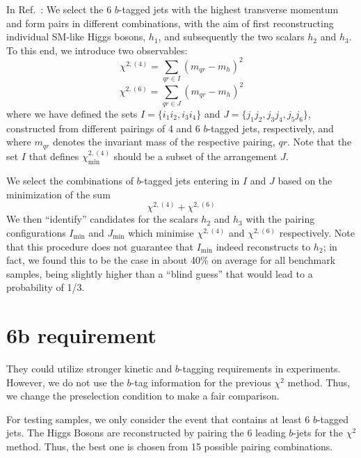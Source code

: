 \documentclass[12pt]{article}
\begin{document}
	In Ref.~\cite{Papaefstathiou:2020lyp}: We select the 6 $b$-tagged jets with the highest transverse momentum and form pairs in different combinations, with the aim of first reconstructing individual SM-like Higgs bosons, $h_1$, and subsequently the two scalars $h_2$ and $h_3$. To this end, we introduce two observables:
	\begin{equation}
		\chi^{2,(4)} = \sum_{qr\in I} (m_{qr} - m_h)^2
	\end{equation}
	\begin{equation}
		\chi^{2,(6)} = \sum_{qr\in J} (m_{qr} - m_h)^2
	\end{equation}
	where we have defined the sets $I = \{i_1i_2,i_3i_4\}$ and $J = \{j_1j_2,j_3j_4,j_5j_6\}$, constructed from different pairings of 4 and 6 $b$-tagged jets, respectively, and where $m_{qr}$ denotes the invariant mass of the respective pairing, $qr$. Note that the set $I$ that defines $\chi_{\text{min}}^{2,(4)}$ should be a subset of the arrangement $J$.

	We select the combinations of $b$-tagged jets entering in $I$ and $J$ based on the minimization of the sum
	\begin{equation}
		\chi^{2,(4)} + \chi^{2,(6)}
	\end{equation}
	We then ``identify'' candidates for the scalars $h_2$ and $h_3$ with the pairing configurations $I_{\text{min}}$ and $J_{\text{min}}$ which minimise $\chi^{2,(4)}$ and $\chi^{2,(6)}$ respectively. Note that this procedure does not guarantee that $I_{\text{min}}$ indeed reconstructs to $h_2$; in fact, we found this to be the case in about 40\% on average for all benchmark samples, being slightly higher than a ``blind guess'' that would lead to a probability of 1/3.

\section{6b requirement}%
\label{sec:6b_requirement}
	They could utilize stronger kinetic and $b$-tagging requirements in experiments. However, we do not use the $b$-tag information for the previous $\chi^2$ method. Thus, we change the preselection condition to make a fair comparison.

	For testing samples, we only consider the event that contains at least 6 $b$-tagged jets. The Higgs Bosons are reconstructed by pairing the 6 leading $b$-jets for the $\chi^2$ method. Thus, the best one is chosen from 15 possible pairing combinations.
\end{document}
